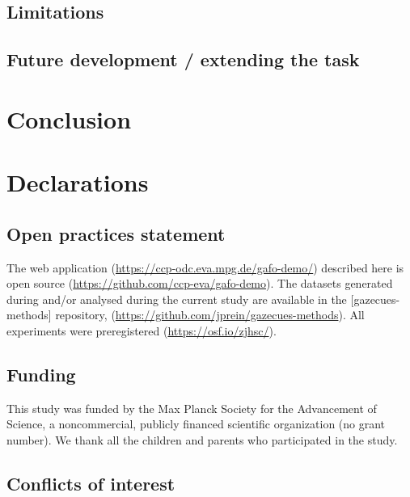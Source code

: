 \documentclass[
  man,floatsintext]{apa6}
\begin{document}
\hypertarget{limitations-1}{%
\subsection{Limitations}\label{limitations-1}}

\hypertarget{future-development-extending-the-task-1}{%
\subsection{Future development / extending the task}\label{future-development-extending-the-task-1}}

\hypertarget{conclusion-1}{%
\section{Conclusion}\label{conclusion-1}}

\hypertarget{declarations}{%
\section{Declarations}\label{declarations}}

\hypertarget{open-practices-statement}{%
\subsection{Open practices statement}\label{open-practices-statement}}

The web application (\url{https://ccp-odc.eva.mpg.de/gafo-demo/}) described here is open source (\url{https://github.com/ccp-eva/gafo-demo}).
The datasets generated during and/or analysed during the current study are available in the {[}gazecues-methods{]} repository, (\url{https://github.com/jprein/gazecues-methods}). All experiments were preregistered (\url{https://osf.io/zjhsc/}).

\hypertarget{funding}{%
\subsection{Funding}\label{funding}}

This study was funded by the Max Planck Society for the Advancement of Science, a noncommercial, publicly financed scientific organization (no grant number). We thank all the children and parents who participated in the study.

\hypertarget{conflicts-of-interest}{%
\subsection{Conflicts of interest}\label{conflicts-of-interest}}
\end{document}
